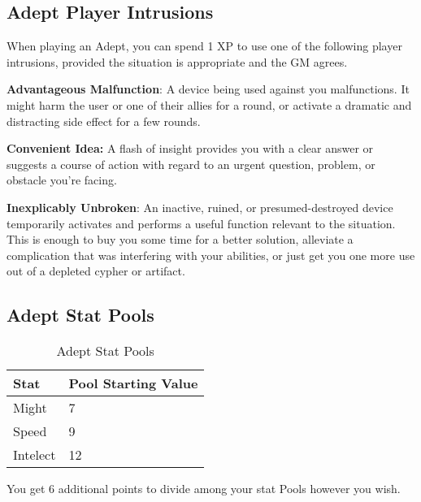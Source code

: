 \subsection{Adept Player Intrusions}

When playing an Adept, you can spend 1 XP to use one of the following player intrusions, provided the situation is appropriate and the GM agrees.

\textbf{Advantageous Malfunction}: A device being used against you malfunctions. It might harm the user or one of their allies for a round, or activate a dramatic and distracting side effect for a few rounds.

\textbf{Convenient Idea:} A flash of insight provides you with a clear answer or suggests a course of action with regard to an urgent question, problem, or obstacle you’re facing.

\textbf{Inexplicably Unbroken}: An inactive, ruined, or presumed-destroyed device temporarily activates and performs a useful function relevant to the situation. This is enough to buy you some time for a better solution, alleviate a complication that was interfering with your abilities, or just get you one more use out of a depleted cypher or artifact.

\subsection{Adept Stat Pools}

\begin{table}[H]
\centering
\caption{Adept Stat Pools}
\label{tab: Adept Stat Pools}

\begin{tabularx}{\linewidth}{| X | X |}
\hline
\textbf{Stat} & \textbf{Pool Starting Value} \\
\hline
Might & 7 \\ \hline
Speed & 9 \\ \hline
Intelect & 12  \\ \hline

\end{tabularx}

\end{table}

\raggedright

You get 6 additional points to divide among your stat Pools however you wish.

